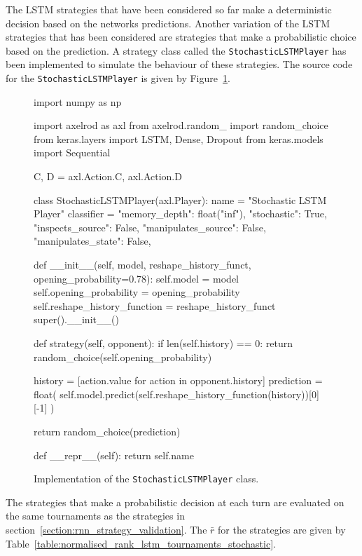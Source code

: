 The LSTM strategies that have been considered so far make a deterministic
decision based on the networks predictions. Another variation of the LSTM
strategies that has been considered are strategies that make a probabilistic
choice based on the prediction. A strategy class called the
\texttt{StochasticLSTMPlayer} has been implemented to simulate the
behaviour of these strategies. The source code for the
\texttt{StochasticLSTMPlayer} is given by
Figure~\ref{fig:stochastic_lstm_player_source_code}.

\begin{figure}[!htbp]
\begin{sourcepy}
import numpy as np

import axelrod as axl
from axelrod.random_ import random_choice
from keras.layers import LSTM, Dense, Dropout
from keras.models import Sequential

C, D = axl.Action.C, axl.Action.D


class StochasticLSTMPlayer(axl.Player):
name = "Stochastic LSTM Player"
classifier = {
    "memory_depth": float("inf"),
    "stochastic": True,
    "inspects_source": False,
    "manipulates_source": False,
    "manipulates_state": False,
}

def __init__(self, model, reshape_history_funct, opening_probability=0.78):
    self.model = model
    self.opening_probability = opening_probability
    self.reshape_history_function = reshape_history_funct
    super().__init__()

def strategy(self, opponent):
    if len(self.history) == 0:
        return random_choice(self.opening_probability)

    history = [action.value for action in opponent.history]
    prediction = float(
        self.model.predict(self.reshape_history_function(history))[0][-1]
    )

    return random_choice(prediction)

def __repr__(self):
    return self.name

\end{sourcepy}
\caption{Implementation of the \texttt{StochasticLSTMPlayer} class.}\label{fig:stochastic_lstm_player_source_code}
\end{figure}

The \lstmstrategies strategies that make a probabilistic decision at each turn
are evaluated on the same \metatournamentslstm tournaments as the strategies
in section~\ref{section:rnn_strategy_validation}. The \(\bar{r}\) for the
strategies are given by Table~\ref{table:normalised_rank_lstm_tournaments_stochastic}.

